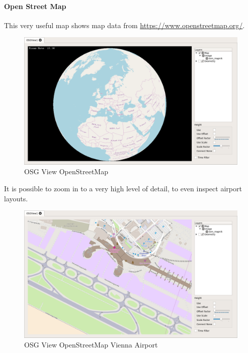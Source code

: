\documentclass[10pt,letterpaper,extrafontsizes]{memoir}
\begin{document}
{\newpage
\paragraph{Open Street Map}

This very useful map shows map data from \url{https://www.openstreetmap.org/}.

\begin{figure}[H]
    \hspace*{-2cm}
    \includegraphics[width=18cm,frame]{../screenshots/osgview_osm.png}
  \caption{OSG View OpenStreetMap}
\end{figure}

It is possible to zoom in to a very high level of detail, to even inspect airport layouts.

\begin{figure}[H]
    \hspace*{-2cm}
    \includegraphics[width=18cm,frame]{../screenshots/osgview_osm_vienna.png}
  \caption{OSG View OpenStreetMap Vienna Airport}
\end{figure}

}
\end{document}
